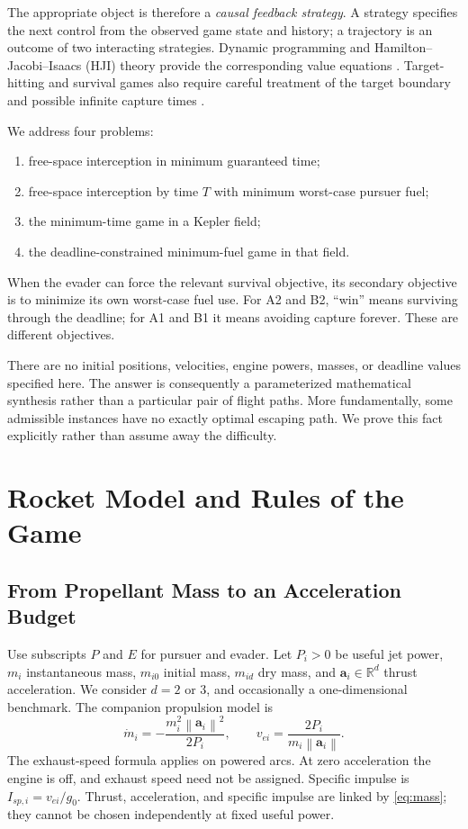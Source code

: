 \documentclass[journal,a4paper]{IEEEtran}
\newcommand{\R}{\mathbb R}
\newcommand{\norm}[1]{\left\|#1\right\|}
\begin{document}
The appropriate object is therefore a \emph{causal feedback strategy}. A strategy specifies the next control from the observed game state and history; a trajectory is an outcome of two interacting strategies. Dynamic programming and Hamilton--Jacobi--Isaacs (HJI) theory provide the corresponding value equations \cite{EvansSouganidis1984}. Target-hitting and survival games also require careful treatment of the target boundary and possible infinite capture times \cite{Soravia1993}.

We address four problems:
\begin{enumerate}
\item[A1)] free-space interception in minimum guaranteed time;
\item[A2)] free-space interception by time $T$ with minimum worst-case pursuer fuel;
\item[B1)] the minimum-time game in a Kepler field;
\item[B2)] the deadline-constrained minimum-fuel game in that field.
\end{enumerate}
When the evader can force the relevant survival objective, its secondary objective is to minimize its own worst-case fuel use. For A2 and B2, ``win'' means surviving through the deadline; for A1 and B1 it means avoiding capture forever. These are different objectives.

There are no initial positions, velocities, engine powers, masses, or deadline values specified here. The answer is consequently a parameterized mathematical synthesis rather than a particular pair of flight paths. More fundamentally, some admissible instances have no exactly optimal escaping path. We prove this fact explicitly rather than assume away the difficulty.

\section{Rocket Model and Rules of the Game}
\label{sec:model}
\subsection{From Propellant Mass to an Acceleration Budget}
Use subscripts $P$ and $E$ for pursuer and evader. Let $P_i>0$ be useful jet power, $m_i$ instantaneous mass, $m_{i0}$ initial mass, $m_{id}$ dry mass, and $\mathbf a_i\in\R^d$ thrust acceleration. We consider $d=2$ or $3$, and occasionally a one-dimensional benchmark. The companion propulsion model is
\begin{equation}
 \dot m_i=-\frac{m_i^2\norm{\mathbf a_i}^2}{2P_i},
 \qquad
 v_{ei}=\frac{2P_i}{m_i\norm{\mathbf a_i}}.
 \label{eq:mass}
\end{equation}
The exhaust-speed formula applies on powered arcs. At zero acceleration the engine is off, and exhaust speed need not be assigned. Specific impulse is $I_{\!sp,i}=v_{ei}/g_0$. Thrust, acceleration, and specific impulse are linked by \eqref{eq:mass}; they cannot be chosen independently at fixed useful power.
\end{document}
